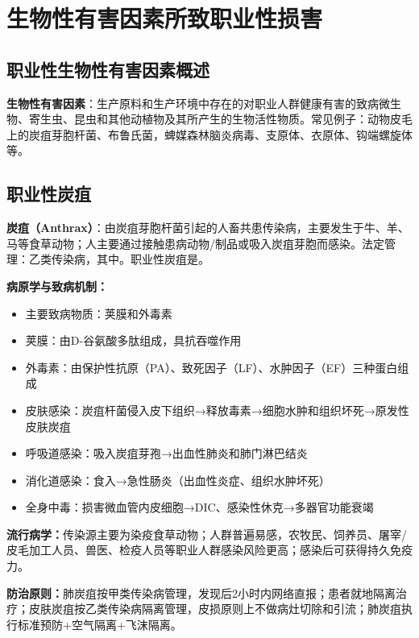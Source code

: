 \chapter{生物性有害因素所致职业性损害}
\setcounter{chapter}{7}

\section{职业性生物性有害因素概述}

\begin{defbox}
\textbf{生物性有害因素}：生产原料和生产环境中存在的对职业人群健康有害的致病微生物、寄生虫、昆虫和其他动植物及其所产生的生物活性物质。常见例子：动物皮毛上的炭疽芽胞杆菌、布鲁氏菌，蜱媒森林脑炎病毒、支原体、衣原体、钩端螺旋体等。
\end{defbox}

\section{职业性炭疽}

\begin{keybox}
\textbf{炭疽（Anthrax）}：由炭疽芽胞杆菌引起的人畜共患传染病，主要发生于牛、羊、马等食草动物；人主要通过接触患病动物/制品或吸入炭疽芽胞而感染。法定管理：乙类传染病，其中。职业性炭疽是。

\textbf{病原学与致病机制：}
\begin{itemize}[leftmargin=*]
    \item 主要致病物质：荚膜和外毒素
    \item 荚膜：由D-谷氨酸多肽组成，具抗吞噬作用
    \item 外毒素：由保护性抗原（PA）、致死因子（LF）、水肿因子（EF）三种蛋白组成
    \item 皮肤感染：炭疽杆菌侵入皮下组织→释放毒素→细胞水肿和组织坏死→原发性皮肤炭疽
    \item 呼吸道感染：吸入炭疽芽孢→出血性肺炎和肺门淋巴结炎
    \item 消化道感染：食入→急性肠炎（出血性炎症、组织水肿坏死）
    \item 全身中毒：损害微血管内皮细胞→DIC、感染性休克→多器官功能衰竭
\end{itemize}

\textbf{流行病学：}传染源主要为染疫食草动物；人群普遍易感，农牧民、饲养员、屠宰/皮毛加工人员、兽医、检疫人员等职业人群感染风险更高；感染后可获得持久免疫力。

\textbf{防治原则：}肺炭疽按甲类传染病管理，发现后2小时内网络直报；患者就地隔离治疗；皮肤炭疽按乙类传染病隔离管理，皮损原则上不做病灶切除和引流；肺炭疽执行标准预防+空气隔离+飞沫隔离。
\end{keybox}

